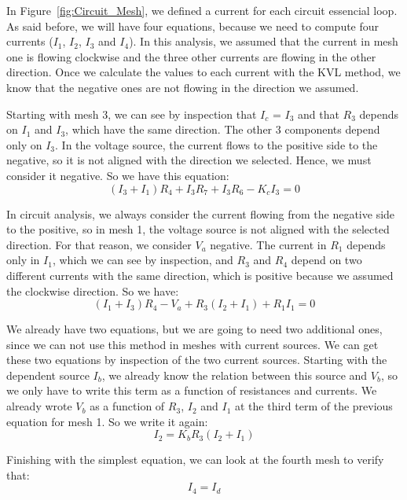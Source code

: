 \noindent In Figure~\ref{fig:Circuit_Mesh}, we defined a current for each circuit essencial loop.
As said before, we will have four equations, because we need to compute four currents
($I_1$, $I_2$, $I_3$ and $I_4$).
In this analysis, we assumed that the current in mesh one is flowing clockwise and the three other currents are flowing in the other direction. Once we calculate the values to each current with the KVL method, we know that the negative ones are not flowing in the direction we assumed.

\noindent Starting with mesh 3, we can see by inspection that $I_c$ = $I_3$  and that $R_3$  depends on $I_1$  and $I_3$, which have the same direction. The other 3 components depend only on $I_3$. In the voltage source, the current flows to the positive side to the negative, so it is not aligned with the direction we selected. Hence, we must consider it negative. So we have this equation:
\begin{equation}
(I_3 + I_1)R_4 + I_3R_7+I_3R_6 - K_cI_3  = 0
  \label{eq:kcl_mesh3}
\end{equation}

\noindent In circuit analysis, we always consider the current flowing from the negative side to the positive, so in mesh 1, the voltage source is not aligned with the selected direction. For that reason, we consider $V_a$ negative. The current in $R_1$ depends only in $I_1$, which we can see by inspection, and $R_3$  and $R_4$  depend on two different currents with the same direction, which is positive because we assumed the clockwise direction. So we have: 
\begin{equation}
(I_1 + I_3)R_4 - V_a + R_3(I_2 + I_1)+ R_1I_1 = 0
  \label{eq:kcl_mesh1}
\end{equation}

\noindent We already have two equations, but we are going to need two additional ones, since we can not use this method in meshes with current sources. We can get these two equations by inspection of the two current sources. Starting with the dependent source $I_b$, we already  know the relation between this source and $V_b$, so we only have to write this term as a function of resistances and currents. We already wrote $V_b$ as a function of $R_3$, $I_2$ and $I_1$ at the third term of the previous equation for mesh 1. So we write it again:
\begin{equation}
I_2 = K_bR_3(I_2+I_1)
  \label{eq:kcl_mesh2}
\end{equation}

\noindent Finishing with the simplest equation, we can look at the fourth mesh to verify that:
\begin{equation}
I_4 = I_d
  \label{eq:kvl_kcl_mesh4}
\end{equation}

